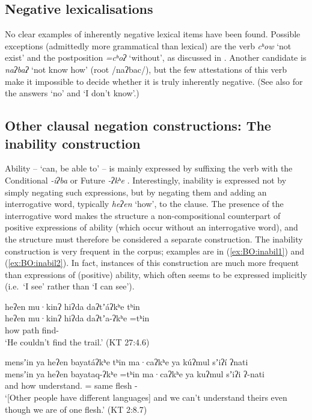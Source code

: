 \documentclass[output=paper,modfonts,nonflat,colorlinks,citecolor=brown]{langscibook}
\begin{document}
\subsection{Negative lexicalisations}

No clear examples of inherently negative lexical items have been found. Possible exceptions (admittedly more grammatical than lexical) are the verb \textit{cʰow} `not exist' and the postposition \textit{=cʰoʔ} `without', as discussed in . Another candidate is \textit{naʔbaʔ} `not know how' (root /naʔbac/), but the few attestations of this verb make it impossible to decide whether it is truly inherently negative. (See also  for the answers `no' and `I don't know'.)

\subsection{Other clausal negation constructions: The inability construction}
\label{sec:BO:inabil}

Ability -- `can, be able to' -- is mainly expressed by suffixing the verb with the Conditional \mbox{\textit{-iʔba}} or Future \textit{-ʔkʰe} \citep[251, 257]{Oswalt1961}. Interestingly, inability is expressed not by simply negating such expressions, but by negating them and adding an interrogative word, typically \textit{heʔen} `how', to the clause. The presence of the interrogative word makes the structure a non-compositional counterpart of positive expressions of ability (which occur without an interrogative word), and the structure must therefore be considered a separate construction.
The inability construction is very frequent in the corpus; examples are in (\ref{ex:BO:inabil1}) and (\ref{ex:BO:inabil2}). In fact, instances of this construction are much more frequent than expressions of (positive) ability, which often seems to be expressed implicitly (i.e.\ `I see' rather than `I can see').

\ea 
\label{ex:BO:inabil1}
\glll heʔen mu·kinʔ hiʔda daʔtʼáʔkʰe tʰin\\
    heʔen mu·kinʔ hiʔda daʔtʼa-ʔkʰe =tʰin\\
    how  path find- \\
\glt `He couldn’t find the trail.' ({KT 27:4.6})\\
\z

\ea 
\label{ex:BO:inabil2}
\glll [\ldots] mensʼin ya heʔen bayatáʔkʰe tʰin ma·caʔkʰe ya kúʔmul sʼiʔí ʔnati\\
    {} mensʼin  ya heʔen bayataq-ʔkʰe =tʰin ma·caʔkʰe ya kuʔmul sʼiʔi ʔ-nati\\
    {} and  how understand. =   same flesh -\\
\glt `[Other people have different languages] and we can’t understand theirs even though we are of one flesh.' ({KT 2:8.7})\\
\z
\end{document}
